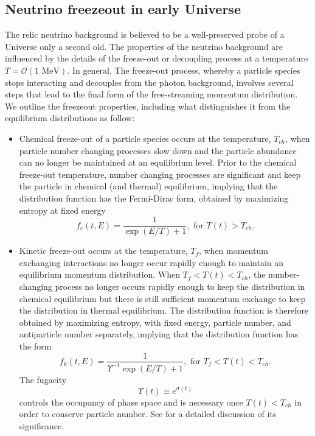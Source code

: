 \documentclass[universe,article,submit,moreauthors,pdftex,a4paper]{Definitions/mdpi}
\newcommand{\MeV}{\text{ MeV}}
\begin{document}
\subsection{Neutrino freezeout in early Universe}\label{sec:Freezeout}
\noindent The relic neutrino background is believed to be a  well-preserved probe of a Universe only a second old. The properties of the neutrino background are influenced by the details of the freeze-out or decoupling process at a temperature $T=\mathcal{O}(1\MeV)$. In general, The freeze-out process, whereby a particle species stops interacting and decouples from the photon background, involves several steps that lead to the final form of the free-streaming momentum distribution. We outline the freezeout properties, including what distinguishes it from the equilibrium distributions as follow\cite{Birrell:2012gg}:
\begin{itemize}
  \item
Chemical freeze-out of a particle species occurs at the temperature, 
$T_{ch}$, when particle number changing processes slow down and the particle abundance can no longer be maintained at an equilibrium level. Prior to the  chemical freeze-out temperature,  number changing processes are significant and keep the particle in chemical (and thermal) equilibrium, implying that the distribution function has the Fermi-Dirac form, obtained by maximizing entropy at fixed energy
\begin{equation}\label{equilibrium}
f_{c}(t,E)=\frac{1}{\exp(E/T)+1}, \text{ for } T(t)> T_{ch}.
\end{equation}

\item
Kinetic freeze-out occurs at the temperature, $T_f$, when momentum exchanging interactions no longer occur rapidly enough to maintain an equilibrium momentum distribution. When $T_f<T(t)<T_{ch}$, the number-changing process  no longer occurs rapidly enough to keep the distribution in chemical equilibrium but there is still sufficient momentum exchange to keep the distribution in thermal equilibrium.  The distribution function is therefore obtained by maximizing entropy, with fixed energy, particle number, and antiparticle number separately,  implying that the distribution function has the form
\begin{equation}\label{kinetic_equilib}
f_k(t,E)=\frac{1}{\Upsilon^{-1}\exp(E/T)+1}, \text{ for }T_f< T(t)< T_{ch}.
\end{equation}
The fugacity
\begin{equation}
\Upsilon(t)\equiv e^{\sigma(t)}
\end{equation}
 controls the occupancy of phase space and is necessary once $T(t)<T_{ch}$ in order to conserve particle number. See \cite{Birrell:2012gg} for a detailed discussion of its significance.
 

\end{itemize}
\end{document}
